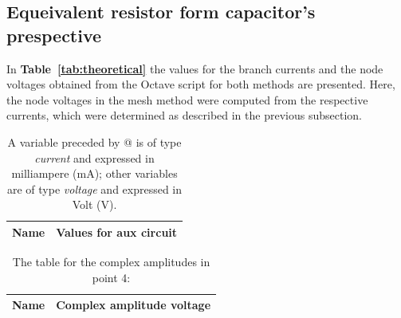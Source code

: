 \subsection{Equeivalent resistor form capacitor's prespective} 




In \textbf{Table~\ref{tab:theoretical}} the values for the branch currents and the node voltages obtained from the Octave script for both methods are presented. Here, the node voltages in the mesh method were computed from the respective currents, which were determined as described in the previous subsection.
 \pagebreak 
\begin{table}[h]
  \centering
  \begin{tabular}{|l|r|}
    \hline    
    {\bf Name} & {\bf Values for aux circuit}\\ \hline
    
  \end{tabular}
  \caption{A variable preceded by @ is of type {\em current}
    and expressed in milliampere (mA); other variables are of type {\it voltage} and expressed in
    Volt (V).}
  \label{tab:equivalent resistor}
\end{table}



 \pagebreak 
\begin{table}[h]
  \centering
  \begin{tabular}{|l|r|}
    \hline    
    {\bf Name} & {\bf Complex amplitude voltage}\\ \hline
    
  \end{tabular}
  \caption{The table for the complex amplitudes in point 4:}
  \label{tab:equivalent resistor}
\end{table}

